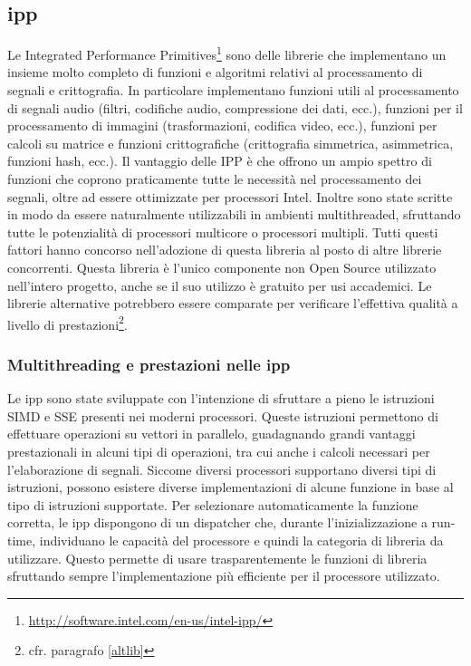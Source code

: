 \subsection{\ac{ipp}}
Le Integrated Performance
Primitives\footnote{\url{http://software.intel.com/en-us/intel-ipp/}} sono delle
librerie che implementano un insieme molto completo di funzioni e algoritmi
relativi al processamento di segnali e crittografia. In particolare implementano
funzioni utili al processamento di segnali audio (filtri, codifiche audio,
compressione dei dati, ecc.), funzioni per il processamento di immagini
(trasformazioni, codifica video, ecc.), funzioni per calcoli su matrice e
funzioni crittografiche (crittografia simmetrica, asimmetrica, funzioni hash,
ecc.).  Il vantaggio delle IPP \`e che offrono un ampio spettro di funzioni che
coprono praticamente tutte le necessit\`a nel processamento dei segnali, oltre
ad essere ottimizzate per processori Intel. Inoltre sono state scritte in modo
da essere naturalmente utilizzabili in ambienti multithreaded, sfruttando tutte
le potenzialit\`a di processori multicore o processori multipli. Tutti questi
fattori hanno concorso nell'adozione di questa libreria al posto di altre
librerie concorrenti. Questa libreria \`e l'unico componente non Open Source
utilizzato nell'intero progetto, anche se il suo utilizzo \`e gratuito per usi
accademici. Le librerie alternative potrebbero essere comparate per verificare
l'effettiva qualit\`a a livello di prestazioni\footnote{cfr. paragrafo
\ref{altlib}}.

\subsubsection{Multithreading e prestazioni nelle \ac{ipp}}
Le \ac{ipp} sono state sviluppate con l'intenzione di sfruttare a pieno le
istruzioni \ac{SIMD} e \ac{SSE} presenti nei moderni processori. Queste
istruzioni permettono di effettuare operazioni su vettori in parallelo,
guadagnando grandi vantaggi prestazionali in alcuni tipi di operazioni, tra cui
anche i calcoli necessari per l'elaborazione di segnali. Siccome diversi
processori supportano diversi tipi di istruzioni, possono esistere diverse
implementazioni di alcune funzione in base al tipo di istruzioni supportate. Per
selezionare automaticamente la funzione corretta, le \ac{ipp} dispongono di un
dispatcher che, durante l'inizializzazione a run-time, individuano le capacit\`a
del processore e quindi la categoria di libreria da utilizzare. Questo permette
di usare trasparentemente le funzioni di libreria sfruttando sempre
l'implementazione pi\`u efficiente per il processore utilizzato.

